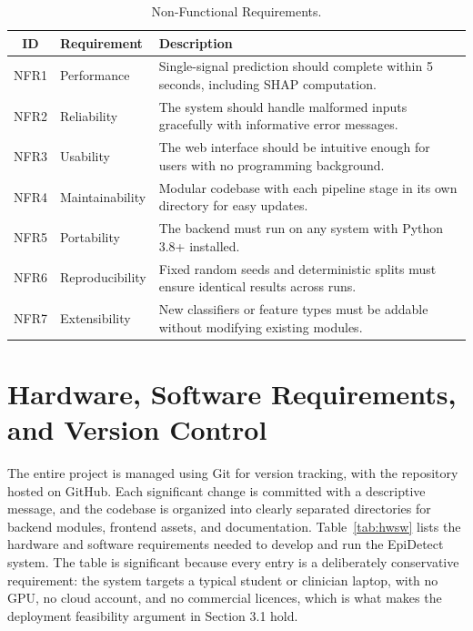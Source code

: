 \begin{table}[htbp]
\centering
\caption{Non-Functional Requirements.}
\label{tab:nonfuncreq}
\begin{tabular}{|c|p{4cm}|p{6.4cm}|}
\hline
\textbf{ID} & \textbf{Requirement} & \textbf{Description} \\
\hline
NFR1 & Performance & Single-signal prediction should complete within 5 seconds, including SHAP computation. \\
\hline
NFR2 & Reliability & The system should handle malformed inputs gracefully with informative error messages. \\
\hline
NFR3 & Usability & The web interface should be intuitive enough for users with no programming background. \\
\hline
NFR4 & Maintainability & Modular codebase with each pipeline stage in its own directory for easy updates. \\
\hline
NFR5 & Portability & The backend must run on any system with Python 3.8+ installed. \\
\hline
NFR6 & Reproducibility & Fixed random seeds and deterministic splits must ensure identical results across runs. \\
\hline
NFR7 & Extensibility & New classifiers or feature types must be addable without modifying existing modules. \\
\hline
\end{tabular}
\end{table}

\section{Hardware, Software Requirements, and Version Control}

The entire project is managed using Git for version tracking, with the repository hosted on GitHub. Each significant change is committed with a descriptive message, and the codebase is organized into clearly separated directories for backend modules, frontend assets, and documentation. Table~\ref{tab:hwsw} lists the hardware and software requirements needed to develop and run the EpiDetect system. The table is significant because every entry is a deliberately conservative requirement: the system targets a typical student or clinician laptop, with no GPU, no cloud account, and no commercial licences, which is what makes the deployment feasibility argument in Section 3.1 hold.

